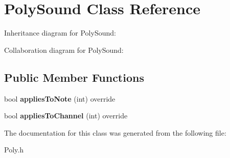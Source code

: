 \hypertarget{class_poly_sound}{}\section{Poly\+Sound Class Reference}
\label{class_poly_sound}


Inheritance diagram for Poly\+Sound\+:


Collaboration diagram for Poly\+Sound\+:
\subsection*{Public Member Functions}
\begin{DoxyCompactItemize}
\item 
bool {\bfseries applies\+To\+Note} (int) override\hypertarget{class_poly_sound_a6461be2fc936158cb167236d52052a20}{}\label{class_poly_sound_a6461be2fc936158cb167236d52052a20}

\item 
bool {\bfseries applies\+To\+Channel} (int) override\hypertarget{class_poly_sound_a6603db551d9b18b04e0f12746509fa0a}{}\label{class_poly_sound_a6603db551d9b18b04e0f12746509fa0a}

\end{DoxyCompactItemize}


The documentation for this class was generated from the following file\+:\begin{DoxyCompactItemize}
\item 
Poly.\+h\end{DoxyCompactItemize}
